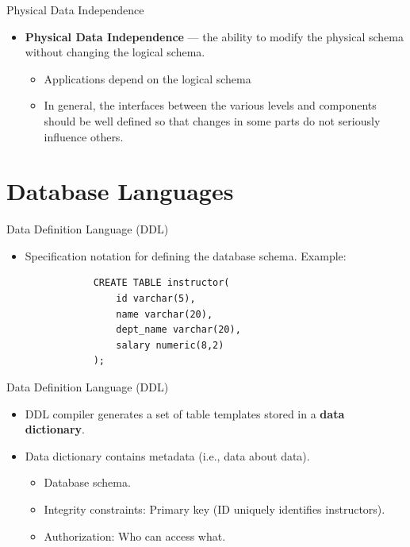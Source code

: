 \documentclass{beamer}
\begin{document}
\begin{frame}{Physical Data Independence}
    \begin{itemize}
        \item \textbf{Physical Data Independence} --- the ability to modify the physical schema without changing the logical schema.
        \begin{itemize}
            \item Applications depend on the logical schema
            \item In general, the interfaces between the various levels and components should be well defined so that changes in some parts do not seriously influence others.
        \end{itemize}
    \end{itemize}
\end{frame}

\section{Database Languages}

\begin{frame}[fragile]{Data Definition Language (DDL)}
    \begin{itemize}
        \item Specification notation for defining the database schema.  Example:
        \begin{verbatim}
            CREATE TABLE instructor(
                id varchar(5), 
                name varchar(20),
                dept_name varchar(20),
                salary numeric(8,2)
            );
        \end{verbatim}
    \end{itemize}
\end{frame}

\begin{frame}{Data Definition Language (DDL)}
    \begin{itemize}
        \item DDL compiler generates a set of table templates stored in a \textbf{data dictionary}.
        \item Data dictionary contains metadata (i.e., data about data).
        \begin{itemize}
            \item Database schema.
            \item Integrity constraints: Primary key (ID uniquely identifies instructors).
            \item Authorization: Who can access what.
        \end{itemize}
    \end{itemize}
\end{frame}
\end{document}
